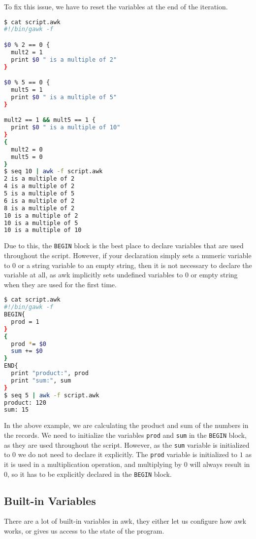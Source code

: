 To fix this issue, we have to reset the variables at the end of the iteration.

\begin{lstlisting}[language=bash]
$ cat script.awk
#!/bin/gawk -f

$0 % 2 == 0 {
  mult2 = 1
  print $0 " is a multiple of 2"
}

$0 % 5 == 0 {
  mult5 = 1
  print $0 " is a multiple of 5"
}

mult2 == 1 && mult5 == 1 {
  print $0 " is a multiple of 10"
}
{
  mult2 = 0
  mult5 = 0
}
$ seq 10 | awk -f script.awk
2 is a multiple of 2
4 is a multiple of 2
5 is a multiple of 5
6 is a multiple of 2
8 is a multiple of 2
10 is a multiple of 2
10 is a multiple of 5
10 is a multiple of 10
\end{lstlisting}

Due to this, the \lstinline|BEGIN| block is the best place to declare variables that are used throughout the script.
However, if your declaration simply sets a numeric variable to $0$ or a string variable to an empty string, then it is not necessary to declare the variable at all, as awk implicitly sets undefined variables to $0$ or empty string when they are used for the first time.

\begin{lstlisting}[language=bash]
$ cat script.awk
#!/bin/gawk -f
BEGIN{
  prod = 1
}
{
  prod *= $0
  sum += $0
}
END{
  print "product:", prod
  print "sum:", sum
}
$ seq 5 | awk -f script.awk
product: 120
sum: 15
\end{lstlisting}

In the above example, we are calculating the product and sum of the numbers in the records.
We need to initialize the variables \lstinline|prod| and \lstinline|sum| in the \lstinline|BEGIN| block, as they are used throughout the script.
However, as the \lstinline|sum| variable is initialized to $0$ we do not need to declare it explicitly.
The \lstinline|prod| variable is initialized to $1$ as it is used in a multiplication operation, and multiplying by $0$ will always result in $0$, so it has to be explicitly declared in the \lstinline|BEGIN| block.

\subsection{Built-in Variables}

There are a lot of built-in variables in awk, they either let us configure how awk works, or gives us access to the state of the program.

